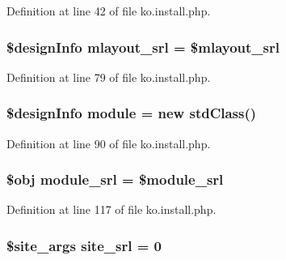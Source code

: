 Definition at line 42 of file ko.\+install.\+php.

\hypertarget{ko_8install_8php_a9cf497537007b08c645bed35f564be54}{
\subsubsection[{mlayout\+\_\+srl}]{\setlength{\rightskip}{0pt plus 5cm}\$design\+Info mlayout\+\_\+srl = \$mlayout\+\_\+srl}}\label{ko_8install_8php_a9cf497537007b08c645bed35f564be54}


Definition at line 79 of file ko.\+install.\+php.

\hypertarget{ko_8install_8php_a5c3fc1968f94c2b6a7c60845f284de78}{
\subsubsection[{module}]{\setlength{\rightskip}{0pt plus 5cm}\$design\+Info {\bf module} = new std\+Class()}}\label{ko_8install_8php_a5c3fc1968f94c2b6a7c60845f284de78}


Definition at line 90 of file ko.\+install.\+php.

\hypertarget{ko_8install_8php_a370bb6450fab1da3e0ed9f484a38b761}{
\subsubsection[{module\+\_\+srl}]{\setlength{\rightskip}{0pt plus 5cm}\$obj module\+\_\+srl = \$module\+\_\+srl}}\label{ko_8install_8php_a370bb6450fab1da3e0ed9f484a38b761}


Definition at line 117 of file ko.\+install.\+php.

\hypertarget{ko_8install_8php_a8b1406b4ad1048041558dce6bfe89004}{
\subsubsection[{site\+\_\+srl}]{\setlength{\rightskip}{0pt plus 5cm}\$site\+\_\+args site\+\_\+srl = 0}}\label{ko_8install_8php_a8b1406b4ad1048041558dce6bfe89004}


